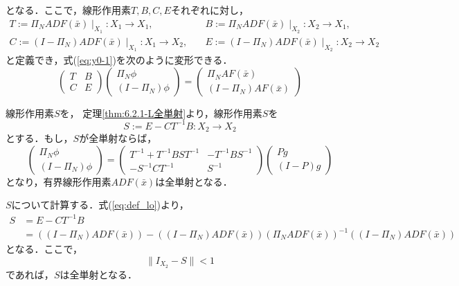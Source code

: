 となる．ここで，線形作用素$T,B,C,E$それぞれに対し，
\begin{equation*}
  \begin{split}
    T:= \Pi_N ADF(\bar{x}) \mid _{X_1}:X_1 \rightarrow X_1,\quad &
    B:= \Pi_N ADF(\bar{x}) \mid _{X_2}:X_2 \rightarrow X_1, \\
    C:= (I-\Pi_N) ADF(\bar{x}) \mid _{X_1}:X_1 \rightarrow X_2,\quad &
    E:= (I-\Pi_N) ADF(\bar{x}) \mid _{X_2}:X_2 \rightarrow X_2
    \label{eq:def_lo}
  \end{split}
\end{equation*}
と定義でき，式(\ref{eq:y0-1})を次のように変形できる．
\begin{equation}
  \begin{pmatrix}
    T & B \\
    C & E
  \end{pmatrix}
  \begin{pmatrix}
    \Pi_N \phi \\
    (I -\Pi_N) \phi
  \end{pmatrix}
  =
  \begin{pmatrix}
    \Pi_N A F(\bar{x}) \\
    (I - \Pi_N) A F(\bar{x})
  \end{pmatrix}
\end{equation}

線形作用素$S$を，
定理\ref{thm:6.2.1-L全単射}より，線形作用素$S$を
\begin{equation*}
  S:=E-CT^{-1}B:X_2 \rightarrow X_2
\end{equation*}
とする．もし，$S$が全単射ならば，
\begin{equation*}
  \begin{pmatrix}
    \Pi_N \phi \\
    (I-\Pi_N)\phi
  \end{pmatrix}
  =
  \begin{pmatrix}
    T^{-1}+T^{-1}BST^{-1} & -T^{-1}BS^{-1} \\
    -S^{-1}CT^{-1} & S^{-1}
  \end{pmatrix}
  \begin{pmatrix}
    Pg \\
    (I-P)g
  \end{pmatrix}
\end{equation*}
となり，有界線形作用素$ADF(\bar{x})$は全単射となる．

$S$について計算する．式(\ref{eq:def_lo})より，
\begin{equation}
  \begin{split}
    S &= E-CT^{-1}B \\
    &= \left( \left( I-\Pi_N \right) ADF ( \bar{x} ) \right) - (\left( I-\Pi_N \right) ADF( \bar{x} )) (\Pi_N ADF(\bar{x}))^{-1} ((I-\Pi_N)ADF(\bar{x}))
  \end{split}
  \label{eq:s-def}
\end{equation}
となる．ここで，
\begin{equation*}
  \| I_{X_2} -S \| < 1
\end{equation*}
であれば，$S$は全単射となる．




